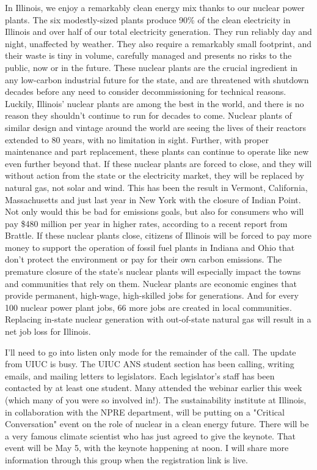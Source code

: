 In Illinois, we enjoy a remarkably clean energy mix thanks to our nuclear power plants. The six modestly-sized plants produce 90\% of the clean electricity in Illinois and over half of our total electricity  generation. They run reliably day and night, unaffected by weather. They also require a remarkably small footprint, and their waste is tiny in volume, carefully managed and presents no risks to the public, now or in the future. These nuclear plants are the crucial ingredient in any low-carbon industrial future for the state, and are threatened with shutdown decades before any need to consider decommissioning for technical reasons. 
Luckily, Illinois’ nuclear plants are among the best in the world, and there is no reason they shouldn’t continue to run for decades to come. Nuclear plants of similar design and vintage around the world are seeing the lives of their reactors extended to 80 years, with no limitation in sight. Further, with proper maintenance and part replacement, these plants can continue to operate like new even further beyond that. 
If these nuclear plants are forced to close, and they will without action from the state or the electricity market, they will be replaced by natural gas, not solar and wind. This has been the result in Vermont, California, Massachusetts and just last year in New York with the closure of Indian Point. Not only would this be bad for emissions goals, but also for consumers who will pay \$480 million per year in higher rates, according to a recent report from Brattle. If these nuclear plants close, citizens of Illinois will be forced to pay more money to support the operation of fossil fuel plants in Indiana and Ohio that don't protect the environment or pay for their own carbon emissions. 
The premature closure of the state’s nuclear plants will especially impact the towns and communities that rely on them. Nuclear plants are economic engines that provide permanent, high-wage, high-skilled jobs for generations. And for every 100 nuclear power plant jobs, 66 more jobs are created in local communities. Replacing in-state nuclear generation with out-of-state natural gas will result in a net job loss for Illinois.  



I’ll need to go into listen only mode for the remainder of the call. The update from UIUC is busy. The UIUC ANS student section has been calling, writing emails, and mailing letters to legislators. Each legislator's staff has been contacted by at least one student. Many attended the webinar earlier this week (which many of you were so involved in!). The sustainability institute at Illinois, in collaboration with the NPRE department, will be putting on a "Critical Conversation" event on the role of nuclear in a clean energy future. There will be a very famous climate scientist who has just agreed to give the keynote. That event will be May 5, with the keynote happening at noon. I will share more information through this group when the registration link is live. 
